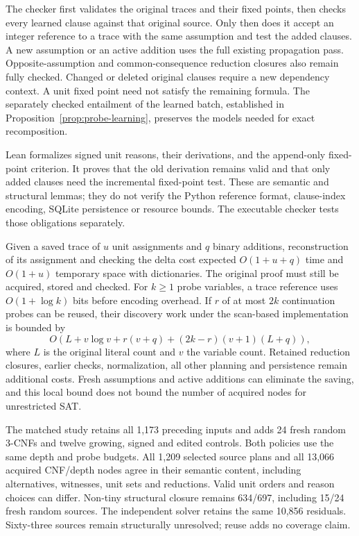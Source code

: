 \documentclass[11pt,a4paper]{article}
\numberwithin{equation}{section}
\theoremstyle{plain}
\theoremstyle{definition}
\theoremstyle{remark}
\begin{document}
The checker first validates the original traces and their fixed points, then checks every learned clause against that original source. Only then does it accept an integer reference to a trace with the same assumption and test the added clauses. A new assumption or an active addition uses the full existing propagation pass. Opposite-assumption and common-consequence reduction closures also remain fully checked. Changed or deleted original clauses require a new dependency context. A unit fixed point need not satisfy the remaining formula. The separately checked entailment of the learned batch, established in Proposition~\ref{prop:probe-learning}, preserves the models needed for exact recomposition.

Lean formalizes signed unit reasons, their derivations, and the append-only fixed-point criterion. It proves that the old derivation remains valid and that only added clauses need the incremental fixed-point test. These are semantic and structural lemmas; they do not verify the Python reference format, clause-index encoding, SQLite persistence or resource bounds. The executable checker tests those obligations separately.

Given a saved trace of $u$ unit assignments and $q$ binary additions, reconstruction of its assignment and checking the delta cost expected $O(1+u+q)$ time and $O(1+u)$ temporary space with dictionaries. The original proof must still be acquired, stored and checked. For $k\geq1$ probe variables, a trace reference uses $O(1+\log k)$ bits before encoding overhead. If $r$ of at most $2k$ continuation probes can be reused, their discovery work under the scan-based implementation is bounded by
\[
O\!\left(L+v\log v+r(v+q)+(2k-r)(v+1)(L+q)\right),
\]
where $L$ is the original literal count and $v$ the variable count. Retained reduction closures, earlier checks, normalization, all other planning and persistence remain additional costs. Fresh assumptions and active additions can eliminate the saving, and this local bound does not bound the number of acquired nodes for unrestricted SAT.

The matched study retains all 1,173 preceding inputs and adds 24 fresh random 3-CNFs and twelve growing, signed and edited controls. Both policies use the same depth and probe budgets. All 1,209 selected source plans and all 13,066 acquired CNF/depth nodes agree in their semantic content, including alternatives, witnesses, unit sets and reductions. Valid unit orders and reason choices can differ. Non-tiny structural closure remains 634/697, including 15/24 fresh random sources. The independent solver retains the same 10,856 residuals. Sixty-three sources remain structurally unresolved; reuse adds no coverage claim.
\end{document}
